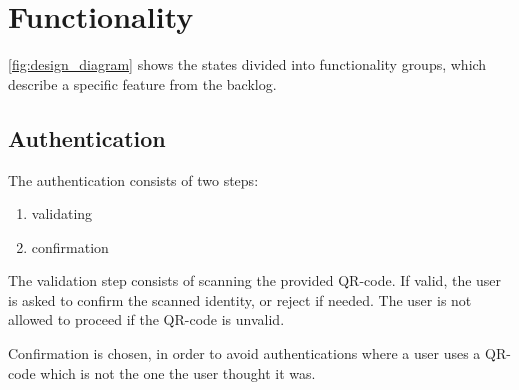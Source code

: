 \section{Functionality}

\autoref{fig:design_diagram} shows the states divided into functionality groups, which describe a specific feature from the backlog.



\subsection{Authentication}


\noindent The authentication consists of two steps:

\begin{enumerate}
	\item validating
	\item confirmation
\end{enumerate}

The validation step consists of scanning the provided QR-code. If valid, the user is asked to confirm the scanned identity, or reject if needed. The user is not allowed to proceed if the QR-code is unvalid.

Confirmation is chosen, in order to avoid authentications where a user uses a QR-code which is not the one the user thought it was.


